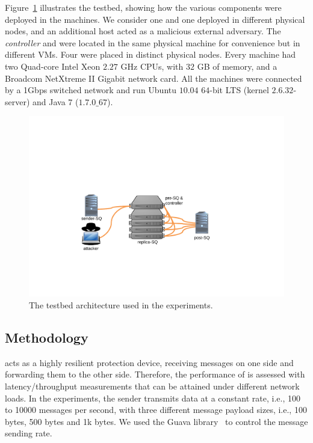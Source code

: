 Figure~\ref{fig:testbed} illustrates the testbed, showing how the various \sieveq components were deployed in the machines.
We consider one \sender and one \postsieve deployed in different physical nodes, and an additional host acted as a malicious external adversary.
The \emph{controller} and \presieves were located in the same physical machine for convenience but in different VMs.
Four \repsieves were placed in distinct physical nodes.
Every machine had two Quad-core Intel Xeon $2.27$ GHz CPUs, with $32$ GB of memory, and a Broadcom NetXtreme II Gigabit network card.
All the machines were connected by a 1Gbps switched network and run Ubuntu $10.04$ $64$-bit LTS (kernel $2.6.32$-server) and Java $7$ ($1.7.0\_67$).


\begin{figure}[ht!]
\includegraphics[width=0.8\columnwidth]{images/images/testbed1.pdf}
\caption{The \sieveq testbed architecture used in the experiments.}
\label{fig:testbed}
\end{figure}


\subsection{Methodology}

\sieveq acts as a highly resilient protection device, receiving messages on one side and forwarding them to the other side.
Therefore, the performance of \sieveq is assessed with latency/throughput measurements that can be attained under different network loads. 
In the experiments, the sender transmits data at a constant rate, i.e., 100 to 10000 messages per second, with three different message payload sizes, i.e., 100 bytes, 500 bytes and 1k bytes.
We used the Guava library~\cite{guava} to control the message sending rate.


